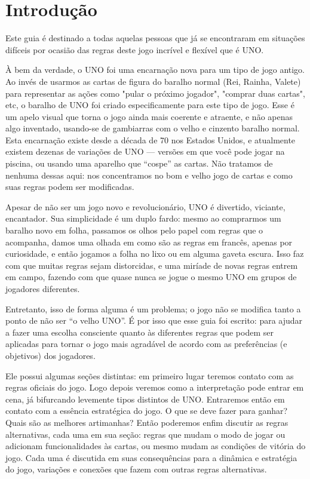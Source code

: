 \chapter*{Introdução}

Este guia é destinado a todas aquelas pessoas que já se encontraram em situações difíceis por ocasião das regras deste jogo incrível e flexível que é UNO.

À bem da verdade, o UNO foi uma encarnação nova para um tipo de jogo antigo. Ao invés de usarmos as cartas de figura do baralho normal (Rei, Rainha, Valete) para representar as ações como "pular o próximo jogador", "comprar duas cartas", etc, o baralho de UNO foi criado especificamente para este tipo de jogo. Esse é um apelo visual que torna o jogo ainda mais coerente e atraente, e não apenas algo inventado, usando-se de gambiarras com o velho e cinzento baralho normal. Esta encarnação existe desde a década de 70 nos Estados Unidos, e atualmente existem dezenas de variações de UNO --- versões em que você pode jogar na piscina, ou usando uma aparelho que ``cospe'' as cartas. Não tratamos de nenhuma dessas aqui: nos concentramos no bom e velho jogo de cartas e como suas regras podem ser modificadas.

Apesar de não ser um jogo novo e revolucionário, UNO é divertido, viciante, encantador. Sua simplicidade é um duplo fardo: mesmo ao comprarmos um baralho novo em folha, passamos os olhos pelo papel com regras que o acompanha, damos uma olhada em como são as regras em francês, apenas por curiosidade, e então jogamos a folha no lixo ou em alguma gaveta escura. Isso faz com que muitas regras sejam distorcidas, e uma miríade de novas regras entrem em campo, fazendo com que quase nunca se jogue o mesmo UNO em grupos de jogadores diferentes.

Entretanto, isso de forma alguma é um problema; o jogo não se modifica tanto a ponto de não ser ``o velho UNO''. É por isso que esse guia foi escrito: para ajudar a fazer uma escolha consciente quanto às diferentes regras que podem ser aplicadas para tornar o jogo mais agradável de acordo com as preferências (e objetivos) dos jogadores.

Ele possui algumas seções distintas: em primeiro lugar teremos contato com as regras oficiais do jogo. Logo depois veremos como a interpretação pode entrar em cena, já bifurcando levemente tipos distintos de UNO. Entraremos então em contato com a essência estratégica do jogo. O que se deve fazer para ganhar? Quais são as melhores artimanhas? Então poderemos enfim discutir as regras alternativas, cada uma em sua seção: regras que mudam o modo de jogar ou adicionam funcionalidades às cartas, ou mesmo mudam as condições de vitória do jogo. Cada uma é discutida em suas consequências para a dinâmica e estratégia do jogo, variações e conexões que fazem com outras regras alternativas.

